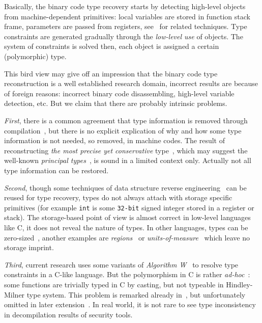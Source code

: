 \documentclass[a4paper]{llncs}
\begin{document}
Basically, the binary code type recovery starts by detecting high-level objects from
machine-dependent primitives: local variables are stored in function stack frame,
parameters are passed from registers, see~\cite{balakrishnan_wysinwyx_2007} for related techniques.
Type constraints are generated gradually through the \emph{low-level use} of objects.
The system of constraints is solved then, each object is assigned a certain
(polymorphic) type.

This bird view may give off an impression that the
binary code type reconstruction is a well established research domain, incorrect results
are because of foreign reasons: incorrect binary code disassembling,
high-level variable detection, etc. But we claim that there are probably intrinsic problems.

\emph{First}, there is a common agreement that type information is removed through
compilation~\cite{lee_tie_2011,caballero_type_2016,lin_automatic_2010},
but there is no explicit explication of why and how some type information is not needed,
so removed, in machine codes. The result of reconstructing \emph{the most precise yet conservative}
type~\cite{lee_tie_2011}, which may suggest the well-known
\emph{principal types}~\cite{damas_principal_1982,hindley_principal_1969},
is sound in a limited context only. Actually not all type
information can be restored.

\emph{Second}, though some techniques of data structure reverse
engineering~\cite{caballero_type_2016, caballero_polyglot_2007} can be reused for
type recovery, types do not always attach with storage specific primitives (for example
\texttt{int} is some \texttt{32-bit} signed integer stored in a register or stack).
The storage-based point of view is almost correct in low-level languages like C, it
does not reveal the nature of types. In other languages, types can be
zero-sized~\cite{noauthor_phantom_nodate}, another examples are
\emph{regions}~\cite{grossman_region-based_2002} or \emph{units-of-measure}~\cite{kennedy_types_2010}
which leave no storage imprint.

\emph{Third}, current research uses some variants of
\emph{Algorithm W}~\cite{milner_theory_1978,cardelli_basic_1987} to resolve type
constraints in a C-like language. But the polymorphism in C is rather
\emph{ad-hoc}~\cite{strachey_fundamental_2000}: some functions are
trivially typed in C by casting, but not typeable in Hindley-Milner type system. This
problem is remarked already in~\cite{mycroft_type-based_1999}, but unfortunately omitted in
later extension~\cite{lee_tie_2011}. In real world, it is not rare to see type inconsistency in decompilation results
of security tools.
\end{document}
